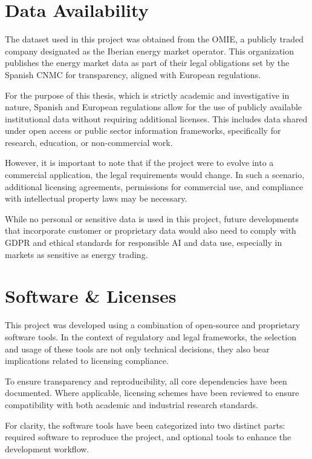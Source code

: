 \documentclass[12pt]{report} %
\begin{document}
\section{Data Availability}

The dataset used in this project was obtained from the OMIE, a publicly traded company designated as the Iberian energy market operator. This organization publishes the energy market data as part of their legal obligations set by the Spanish CNMC for transparency, aligned with European regulations.

For the purpose of this thesis, which is strictly academic and investigative in nature, Spanish and European regulations allow for the use of publicly available institutional data without requiring additional licenses. This includes data shared under open access or public sector information frameworks, specifically for research, education, or non-commercial work.

However, it is important to note that if the project were to evolve into a commercial application, the legal requirements would change. In such a scenario, additional licensing agreements, permissions for commercial use, and compliance with intellectual property laws may be necessary.

While no personal or sensitive data is used in this project, future developments that incorporate customer or proprietary data would also need to comply with GDPR and ethical standards for responsible AI and data use, especially in markets as sensitive as energy trading.

\section{Software \& Licenses}

This project was developed using a combination of open-source and proprietary software tools. In the context of regulatory and legal frameworks, the selection and usage of these tools are not only technical decisions, they also bear implications related to licensing compliance.

To ensure transparency and reproducibility, all core dependencies have been documented. Where applicable, licensing schemes have been reviewed to ensure compatibility with both academic and industrial research standards.

For clarity, the software tools have been categorized into two distinct parts: required software to reproduce the project, and optional tools to enhance the development workflow.
\end{document}
